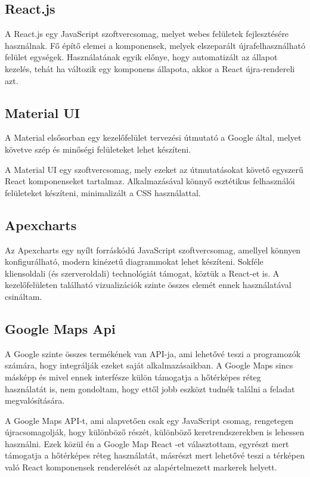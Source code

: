\subsection{React.js}
A React.js \cite{react} egy JavaScript szoftvercsomag, melyet webes felületek fejlesztésére használnak.
Fő építő elemei a komponensek, melyek elszeparált újrafelhasználható felület egységek.
Használatának egyik előnye, hogy automatizált az állapot kezelés, tehát ha változik egy komponens állapota, akkor a React újra-rendereli azt.

\subsection{Material UI}
A Material \cite{material} elsősorban egy kezelőfelület tervezési útmutató a Google által, melyet követve szép és minőségi felületeket lehet készíteni.

A Material UI \cite{material-ui} egy szoftvercsomag, mely ezeket az útmutatásokat követő egyszerű React komponenseket tartalmaz.
Alkalmazásával könnyő esztétikus felhasználói felületeket készíteni, minimalizált a CSS használattal. 

\subsection{Apexcharts}
Az Apexcharts \cite{apexcharts} egy nyílt forráskódú JavaScript szoftvercsomag, amellyel könnyen konfigurálható, modern kinézetű diagrammokat lehet készíteni.
Sokféle kliensoldali (és szerveroldali) technológiát támogat, köztük a React-et is. A kezelőfelületen található vizualizációk szinte összes elemét ennek használatával csináltam.

\subsection{Google Maps Api}
A Google szinte összes termékének van API-ja, ami lehetővé teszi a programozók számára, hogy integrálják ezeket saját alkalmazásaikban.
A Google Maps sincs másképp és mivel ennek interfésze külön támogatja a hőtérképes réteg használatát is, nem gondoltam, hogy ettől jobb eszközt tudnék találni a feladat megvalósítására.

A Google Maps API-t, ami alapvetően csak egy JavaScript csomag, rengetegen újracsomagolják, hogy különböző részét, különböző keretrendszerekben is lehessen használni.
Ezek közül én a Google Map React \cite{google-map-react}-et választottam, egyrészt mert támogatja a hőtérképes réteg használatát, 
másrészt mert lehetővé teszi a térképen való React komponensek renderelését az alapértelmezett markerek helyett.